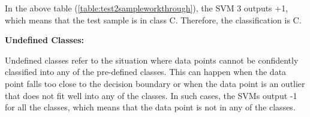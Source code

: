 \documentclass[12pt]{report}
\begin{document}
In the above table (\ref{table:test2sampleworkthrough}), the SVM 3 outputs +1, which means that the test sample is in class C. Therefore, the classification is C.

\vspace{10pt}

\textbf{Undefined Classes:}\newline

Undefined classes refer to the situation where data points cannot be confidently classified into any of the pre-defined classes.
This can happen when the data point falls too close to the decision boundary or when the data point is an outlier that does not fit well into any of the classes.
In such cases, the SVMs output -1 for all the classes, which means that the data point is not in any of the classes.
\end{document}
